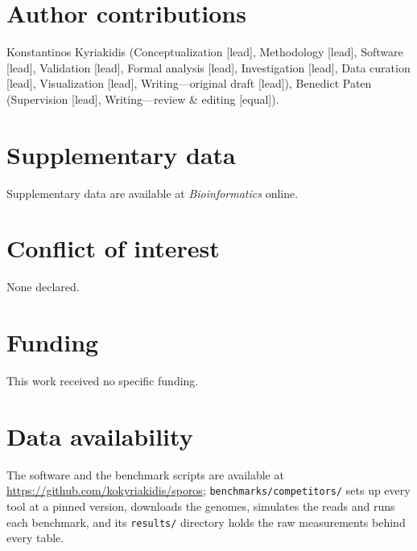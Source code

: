 \section*{Author contributions}
Konstantinos Kyriakidis (Conceptualization [lead], Methodology [lead], Software [lead], Validation [lead], Formal analysis [lead], Investigation [lead], Data curation [lead], Visualization [lead], Writing---original draft [lead]), Benedict Paten (Supervision [lead], Writing---review \& editing [equal]).

\section*{Supplementary data}
Supplementary data are available at \emph{Bioinformatics} online.

\section*{Conflict of interest}
None declared.

\section*{Funding}
This work received no specific funding.

\section*{Data availability}
The software and the benchmark scripts are available at \url{https://github.com/kokyriakidis/sporos}; \texttt{benchmarks/competitors/} sets up every tool at a pinned version, downloads the genomes, simulates the reads and runs each benchmark, and its \texttt{results/} directory holds the raw measurements behind every table.
